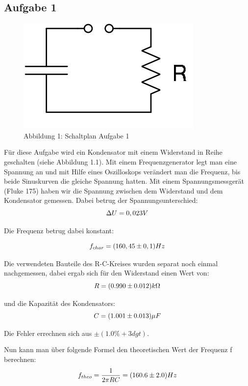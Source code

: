 \subsection{Aufgabe 1}
\begin{figure}[H]
\includegraphics[scale=0.5]{sb1}
\caption{Abbildung 1: Schaltplan Aufgabe 1}
\end{figure}

Für diese Aufgabe wird ein Kondensator mit einem Widerstand in Reihe geschalten (siehe Abbildung 1.1). Mit einem Frequenzgenerator legt man eine Spannung an und mit Hilfe eines Oszilloskops verändert man die Frequenz, bis beide Sinuskurven die gleiche Spannung hatten. Mit einem Spannungsmessgerät (Fluke 175) haben wir die Spannung zwischen dem Widerstand und dem Kondensator gemessen. Dabei betrug der Spannungsunterschied:
\begin{equation}
\notag
\Delta U=0,023 V
\end{equation}

Die Frequenz betrug dabei konstant:

\begin{equation}\notag
f_{char} = (160,45\pm 0,1) Hz
\end{equation}

Die verwendeten Bauteile des R-C-Kreises wurden separat noch einmal nachgemessen, dabei ergab sich für den Widerstand einen Wert von:
\begin{equation}\notag
R = (0.990 \pm 0.012)k\Omega
\end{equation}

und die Kapazität des Kondensators:
\begin{equation}\notag
C = (1.001 \pm 0.013)\mu F
\end{equation}

Die Fehler errechnen sich aus $\pm (1.0\% +3dgt)$.

Nun kann man über folgende Formel den theoretischen Wert der Frequenz f berechnen:
\begin{equation}\notag
f_{theo}=\frac{1}{2\pi RC}= (160.6 \pm 2.0)Hz
\end{equation}

